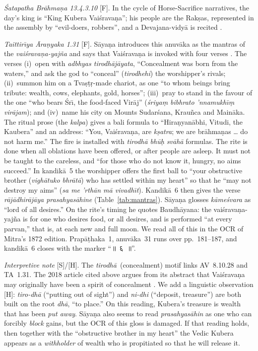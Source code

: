 \documentclass[journal]{IEEEtran}
\theoremstyle{definition}
\newcommand{\Fact}{\textsf{[F]}}
\newcommand{\Schol}{\textsf{[S]}}
\newcommand{\Hyp}{\textsf{[H]}}
\begin{document}
\emph{\'Satapatha Br\=ahma\d na 13.4.3.10} \Fact. In the cycle of Horse-Sacrifice narratives, the day's king is ``King Kubera Vai\'srava\d na''; his people are the Rak\d sas, represented in the assembly by ``evil-doers, robbers'', and a Devajana-vidy\=a is recited \cite{eggeling1900sbe44}.

\emph{Taittir\=\i ya \=Ara\d nyaka 1.31} \Fact. S\=aya\d na introduces this anuv\=aka as the mantras of the \emph{vai\'srava\d na-yaj\~na} and says that Vai\'srava\d na is invoked with four verses \cite{mitra1872ta}. The verses (i)~open with \emph{adbhyas tirodh\=aj\=ayata}, ``Concealment was born from the waters,'' and ask the god to ``conceal'' (\emph{tirodhehi}) the worshipper's rivals; (ii)~summon him on a Tva\d s\d t\d r-made chariot, as one ``to whom beings bring tribute: wealth, cows, elephants, gold, horses''; (iii)~pray to stand in the favour of the one ``who bears \'Sr\=\i{}, the food-faced Vir\=aj'' (\emph{\'sriya\d m bibhrato 'nnamukh\=\i\d m vir\=ajam}); and (iv)~name his city on Mounts Sudar\'sana, Krau\~nca and Main\=aka. The ritual prose (the \emph{kalpa}) gives a bali formula to ``Hira\d nyan\=abhi, Vitudi, the Kaubera'' and an address: ``You, Vai\'srava\d na, are \emph{k\d satra}; we are br\=ahma\d nas \dots{} do not harm me.'' The fire is installed with \emph{tirodh\=a bh\=u\d h sv\=ah\=a} formulas. The rite is done when all oblations have been offered, or after people are asleep. It must not be taught to the careless, and ``for those who do not know it, hungry, no aims succeed.'' In kandik\=a~5 the worshipper offers the first ball to ``your obstructive brother (\emph{vigh\=atuko bhr\=at\=a}) who has settled within my heart'' so that he ``may not destroy my aims'' (\emph{sa me 'rth\=an m\=a vivadh\=\i t}). Kandik\=a~6 then gives the verse \emph{r\=aj\=adhir\=aj\=aya prasahyas\=ahine} (Table~\ref{tab:mantras}). S\=aya\d na glosses \emph{k\=ame\'svara} as ``lord of all desires.'' On the rite's timing he quotes Baudh\=ayana: the vai\'srava\d na-yaj\~na is for one who desires food, or all desires, and is performed ``at every parvan,'' that is, at each new and full moon. We read all of this in the OCR of Mitra's 1872 edition. Prap\=a\d thaka~1, anuv\=aka~31 runs over pp.~181--187, and kandik\=a~6 closes with the marker ``{\deva ॥~६~॥}''.

\emph{Interpretive note} \Schol/\Hyp. The \emph{tirodh\=a}~(concealment) motif links AV~8.10.28 and TA~1.31. The 2018 article cited above argues from its abstract that Vai\'srava\d na may originally have been a spirit of concealment \cite{joi2018vaisravana}. We add a linguistic observation \Hyp: \emph{tiro-dh\=a} (``putting out of sight'') and \emph{ni-dhi} (``deposit, treasure'') are both built on the root \emph{dh\=a}, ``to place.'' On this reading, Kubera's treasure is wealth that has been \emph{put away}. S\=aya\d na also seems to read \emph{prasahyas\=ahin} as one who can forcibly \emph{block} gains, but the OCR of this gloss is damaged. If that reading holds, then together with the ``obstructive brother in my heart'' the Vedic Kubera appears as a \emph{withholder} of wealth who is propitiated so that he will release it.
\end{document}
